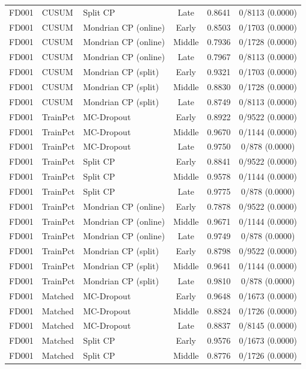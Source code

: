 \begin{table}[t]
\begin{tabular}{lllccc}
FD001 & CUSUM & Split CP & Late & 0.8641 & 0/8113 (0.0000) \\
FD001 & CUSUM & Mondrian CP (online) & Early & 0.8503 & 0/1703 (0.0000) \\
FD001 & CUSUM & Mondrian CP (online) & Middle & 0.7936 & 0/1728 (0.0000) \\
FD001 & CUSUM & Mondrian CP (online) & Late & 0.7967 & 0/8113 (0.0000) \\
FD001 & CUSUM & Mondrian CP (split) & Early & 0.9321 & 0/1703 (0.0000) \\
FD001 & CUSUM & Mondrian CP (split) & Middle & 0.8830 & 0/1728 (0.0000) \\
FD001 & CUSUM & Mondrian CP (split) & Late & 0.8749 & 0/8113 (0.0000) \\
FD001 & TrainPct & MC-Dropout & Early & 0.8922 & 0/9522 (0.0000) \\
FD001 & TrainPct & MC-Dropout & Middle & 0.9670 & 0/1144 (0.0000) \\
FD001 & TrainPct & MC-Dropout & Late & 0.9750 & 0/878 (0.0000) \\
FD001 & TrainPct & Split CP & Early & 0.8841 & 0/9522 (0.0000) \\
FD001 & TrainPct & Split CP & Middle & 0.9578 & 0/1144 (0.0000) \\
FD001 & TrainPct & Split CP & Late & 0.9775 & 0/878 (0.0000) \\
FD001 & TrainPct & Mondrian CP (online) & Early & 0.7878 & 0/9522 (0.0000) \\
FD001 & TrainPct & Mondrian CP (online) & Middle & 0.9671 & 0/1144 (0.0000) \\
FD001 & TrainPct & Mondrian CP (online) & Late & 0.9749 & 0/878 (0.0000) \\
FD001 & TrainPct & Mondrian CP (split) & Early & 0.8798 & 0/9522 (0.0000) \\
FD001 & TrainPct & Mondrian CP (split) & Middle & 0.9641 & 0/1144 (0.0000) \\
FD001 & TrainPct & Mondrian CP (split) & Late & 0.9810 & 0/878 (0.0000) \\
FD001 & Matched & MC-Dropout & Early & 0.9648 & 0/1673 (0.0000) \\
FD001 & Matched & MC-Dropout & Middle & 0.8824 & 0/1726 (0.0000) \\
FD001 & Matched & MC-Dropout & Late & 0.8837 & 0/8145 (0.0000) \\
FD001 & Matched & Split CP & Early & 0.9576 & 0/1673 (0.0000) \\
FD001 & Matched & Split CP & Middle & 0.8776 & 0/1726 (0.0000) \\

\end{tabular}
\end{table}

